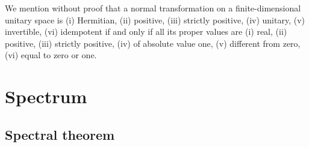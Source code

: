We mention without proof that
a normal transformation on a finite-dimensional unitary space is
(i) Hermitian,
(ii) positive,
(iii) strictly positive,
(iv) unitary,
(v) invertible,
(vi) idempotent
if and only if all its proper values are
(i) real,
(ii) positive,
(iii) strictly positive,
(iv) of absolute value one,
(v) different from zero,
(vi) equal to zero or one.

\section{Spectrum}


\subsection{Spectral theorem}
\label{2012-m-ch-Spectraltheorem}

